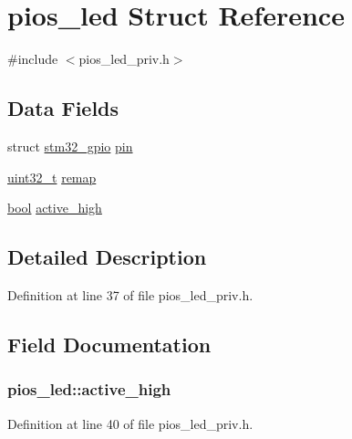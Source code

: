 \hypertarget{structpios__led}{\section{pios\-\_\-led Struct Reference}
\label{structpios__led}
}


{\ttfamily \#include $<$pios\-\_\-led\-\_\-priv.\-h$>$}

\subsection*{Data Fields}
\begin{DoxyCompactItemize}
\item 
struct \hyperlink{structstm32__gpio}{stm32\-\_\-gpio} \hyperlink{structpios__led_a11fcfad24672a8ba07ab81baea1dffaa}{pin}
\item 
\hyperlink{stdint_8h_a435d1572bf3f880d55459d9805097f62}{uint32\-\_\-t} \hyperlink{structpios__led_ab372d17fd1c41d5366ac92b402773710}{remap}
\item 
\hyperlink{group___exported__types_gaf6a258d8f3ee5206d682d799316314b1}{bool} \hyperlink{structpios__led_a628f51c582805e453bed30e26e7853fd}{active\-\_\-high}
\end{DoxyCompactItemize}


\subsection{Detailed Description}


Definition at line 37 of file pios\-\_\-led\-\_\-priv.\-h.



\subsection{Field Documentation}
\hypertarget{structpios__led_a628f51c582805e453bed30e26e7853fd}{
\subsubsection[{active\-\_\-high}]{ pios\-\_\-led\-::active\-\_\-high}}\label{structpios__led_a628f51c582805e453bed30e26e7853fd}


Definition at line 40 of file pios\-\_\-led\-\_\-priv.\-h.

